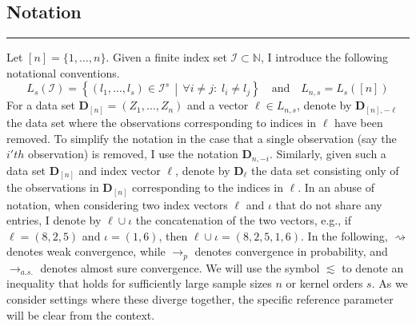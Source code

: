 \subsection{Notation}
\hrule
Let $[n] = \{1, \dotsc, n\}$.
Given a finite index set $\mathcal{I} \subset \mathbb{N}$, I introduce the following notational conventions.
\begin{equation}
	L_{s}(\mathcal{I}) = \left\{\left(l_1, \dotsc, l_s\right) \in \mathcal{I}^{s} \, \middle| \, \forall i \neq j: \; l_i \neq l_j\right\}
	\quad \text{and} \quad
	L_{n,s} = L_s\left([n]\right)
\end{equation}
For a data set $\mathbf{D}_{[n]} = \left(Z_1, \dotsc, Z_{n}\right)$ and a vector $\ell \in L_{n,s}$, denote by $\mathbf{D}_{[n], -\ell}$ the data set where the observations corresponding to indices in $\ell$ have been removed.
To simplify the notation in the case that a single observation (say the $i'th$ observation) is removed, I use the notation $\mathbf{D}_{n, -i}$.
Similarly, given such a data set $\mathbf{D}_{[n]}$ and index vector $\ell$, denote by $\mathbf{D}_{\ell}$ the data set consisting only of the observations in $\mathbf{D}_{[n]}$ corresponding to the indices in $\ell$.
In an abuse of notation, when considering two index vectors $\ell$ and $\iota$ that do not share any entries, I denote by $\ell \cup \iota$ the concatenation of the two vectors, e.g., if $\ell = (8,2,5)$ and $\iota = (1,6)$, then $\ell \cup \iota = (8,2,5,1,6)$.
In the following, $\rightsquigarrow$ denotes weak convergence, while $\rightarrow_{p}$ denotes convergence in probability, and $\rightarrow_{a.s.}$ denotes almost sure convergence. 
We will use the symbol $\lesssim$ to denote an inequality that holds for sufficiently large sample sizes $n$ or kernel orders $s$. 
As we consider settings where these diverge together, the specific reference parameter will be clear from the context.

